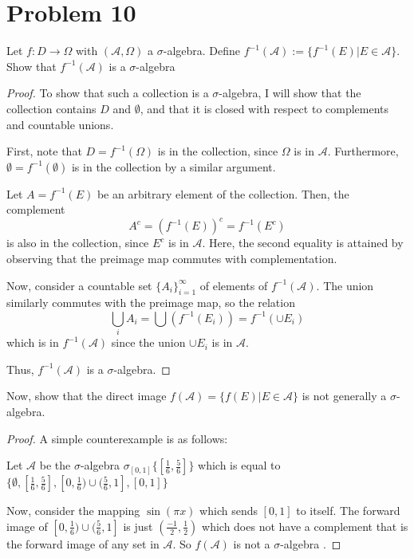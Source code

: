 \documentclass[paper=a4, fontsize=11pt]{scrartcl} %
\numberwithin{equation}{section} %
\numberwithin{figure}{section} %
\numberwithin{table}{section} %
\newcommand{\sigalg}{$\sigma$-algebra }
\begin{document}
\section*{Problem 10}
Let $f: D \to \Omega$ with $(\mathscr{A}, \Omega)$  a $\sigma$-algebra.
Define $f^{-1}(\mathscr{A}) := \{f^{-1}(E) | E\in \mathscr{A}\}$.
Show that $f^{-1}(\mathscr{A})$ is a $\sigma$-algebra
\\
\begin{proof}
To show that such a collection is a $\sigma$-algebra, I will show that the 
collection contains $D$ and $\emptyset$, and that it is closed
with respect to complements and countable unions.

First, note that $D = f^{-1}(\Omega)$ is in the collection, since $\Omega$
is in $\mathscr{A}$. Furthermore, $\emptyset = f^{-1}(\emptyset)$ is in the
collection by a similar argument.

Let $A = f^{-1}(E)$ be an arbitrary element of the collection. Then, the complement
\[
A^c = (f^{-1}(E))^c = f^{-1}(E^c)
\]
is also in the collection, since $E^c$ is in $\mathscr{A}$. Here, the second equality
is attained by observing that the preimage map commutes with complementation.

Now, consider a countable set $\{A_i\}_{i=1}^{\infty}$ of elements of $f^{-1}(\mathscr{A})$.
The union similarly commutes with the preimage map, so the relation
\[
\bigcup_i A_i = \bigcup(f^{-1}(E_i)) = f^{-1}(\cup E_i)
\]
which is in $f^{-1}(\mathscr{A})$ since the union $\cup E_i$ is in $\mathscr{A}$. 

Thus, $f^{-1}(\mathscr{A})$ is a $\sigma$-algebra.
\end{proof}

Now, show that the direct image $f(\mathscr{A}) = \{f(E) | E\in\mathscr{A}\}$
is not generally a $\sigma$-algebra.

\begin{proof}
A simple counterexample is as follows:

Let $\mathscr{A}$ be the \sigalg $\sigma_{[0,1]}\{[\frac{1}{6}, \frac{5}{6}]\}$
which is equal to $\{\emptyset, [\frac{1}{6},\frac{5}{6}],[0,\frac{1}{6}) \cup (\frac{5}{6},1],[0,1]\}$

Now, consider the mapping $\sin(\pi x)$ which sends $[0,1]$ to itself.
The forward image of $[0,\frac{1}{6}) \cup (\frac{5}{6},1]$ is just $(\frac{-1}{2},\frac{1}{2})$
which does not have a complement that is the forward image of any set in $\mathscr{A}$. So
$f(\mathscr{A})$ is not a \sigalg.
\end{proof}
\end{document}
